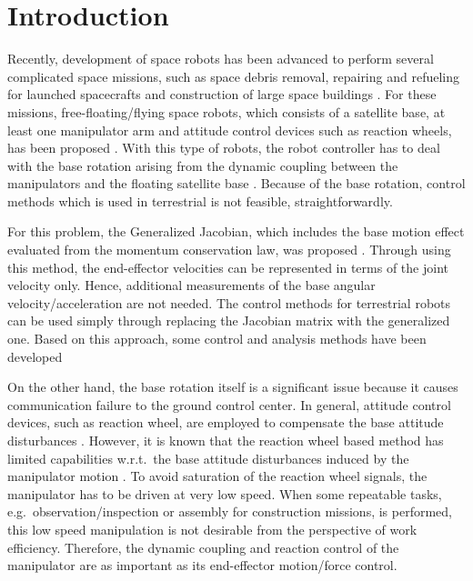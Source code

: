 \documentclass[preprint,12pt]{elsarticle}
\begin{document}

\section{Introduction}
\label{sec:INTRO}
Recently, development of space robots has been advanced to perform
several complicated space missions, such as space debris removal, repairing and refueling for
launched spacecrafts and construction of large space buildings \cite{Flores-Abad2014}.
For these missions,
free-floating/flying space robots, which consists of a satellite base, at least one manipulator arm and
attitude control devices such as reaction wheels, has been proposed \cite{Vafa1987}.
With this type of robots,
the robot controller has to deal with the base rotation arising from the dynamic coupling
between the manipulators and the floating satellite base \cite{Masutani}.
Because of the base rotation,
control methods which is used in terrestrial is not feasible, straightforwardly.

For this problem,
the Generalized Jacobian, which includes the base motion effect evaluated from the momentum conservation law,
was proposed \cite{Masutani,Umetani1989}.
Through using this method,
the end-effector velocities can be represented in terms of the joint velocity only.
Hence, additional measurements of the base angular velocity/acceleration are not needed.
The control methods for terrestrial robots can be used simply
through replacing the Jacobian matrix with the generalized one.
Based on this approach,
some control and analysis methods have been developed \cite{Moosavian2007,Yoshida1992,Umetani2001}

On the other hand,
the base rotation itself is a significant issue because it causes communication failure to the ground control center.
In general,
attitude control devices, such as reaction wheel, are employed
to compensate the base attitude disturbances \cite{Yoshida1994,Aghili20092}.
However, it is known that the reaction wheel based method
has limited capabilities w.r.t.\ the base attitude disturbances induced
 by the manipulator motion \cite{Yoshida2003}.
To avoid saturation of the reaction wheel signals,
the manipulator has to be driven at very low speed.
When some repeatable tasks, e.g.\ observation/inspection or assembly for construction missions, is performed,
this low speed manipulation is not desirable from
the perspective of work efficiency.
Therefore, the dynamic coupling and reaction control of
the manipulator are as important as its end-effector
motion/force control.
\end{document}
